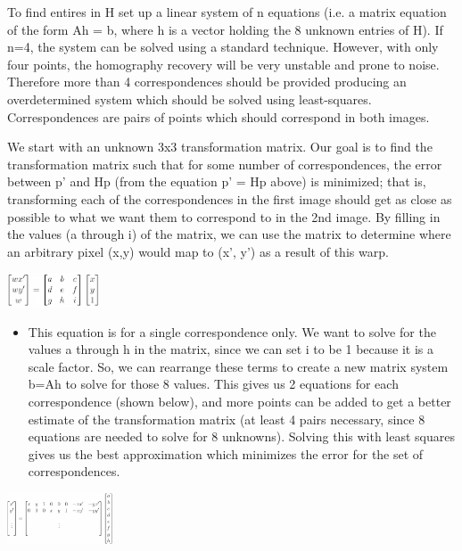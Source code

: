 \documentclass[3pt,landscape]{article}
\begin{document}
\begin{multicols}{3}
\begin{itemize}
To find entires in H set up a linear system of n equations (i.e. a matrix equation of the form Ah = b, where h is a vector holding the 8 unknown entries of H). If n=4, the system can be solved using a standard technique. However, with only four points, the homography recovery will be very unstable and prone to noise. Therefore more than 4 correspondences should be provided producing an overdetermined system which should be solved using least-squares. Correspondences are pairs of points which should correspond in both images. 

We start with an unknown 3x3 transformation matrix. Our goal is to find the transformation matrix such that for some number of correspondences, the error between p' and Hp (from the equation p' = Hp above) is minimized; that is, transforming each of the correspondences in the first image should get as close as possible to what we want them to correspond to in the 2nd image. By filling in the values (a through i) of the matrix, we can use the matrix to determine where an arbitrary pixel (x,y) would map to (x', y') as a result of this warp.
\end{itemize}
\begin{center}
    \includegraphics[height=1cm]{images/homography.png}
\end{center}
\begin{itemize}
\item This equation is for a single correspondence only. We want to solve for the values a through h in the matrix, since we can set i to be 1 because it is a scale factor. So, we can rearrange these terms to create a new matrix system b=Ah to solve for those 8 values. This gives us 2 equations for each correspondence (shown below), and more points can be added to get a better estimate of the transformation matrix (at least 4 pairs necessary, since 8 equations are needed to solve for 8 unknowns). Solving this with least squares gives us the best approximation which minimizes the error for the set of correspondences.
\end{itemize}
\begin{center}
    \includegraphics[height=1.5cm]{images/homography-values.png}

\end{center}
\end{multicols}
\end{document}
